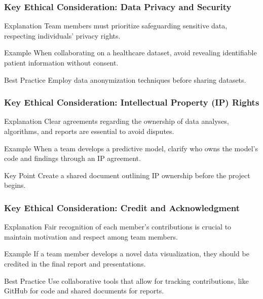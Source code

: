 \documentclass[aspectratio=169]{beamer}
\begin{document}
\begin{frame}[fragile]
    \frametitle{Key Ethical Consideration: Data Privacy and Security}
    \begin{block}{Explanation}
        Team members must prioritize safeguarding sensitive data, respecting individuals' privacy rights.
    \end{block}
    \begin{exampleblock}{Example}
        When collaborating on a healthcare dataset, avoid revealing identifiable patient information without consent.
    \end{exampleblock}
    \begin{block}{Best Practice}
        Employ data anonymization techniques before sharing datasets.
    \end{block}
\end{frame}

\begin{frame}[fragile]
    \frametitle{Key Ethical Consideration: Intellectual Property (IP) Rights}
    \begin{block}{Explanation}
        Clear agreements regarding the ownership of data analyses, algorithms, and reports are essential to avoid disputes.
    \end{block}
    \begin{exampleblock}{Example}
        When a team develops a predictive model, clarify who owns the model's code and findings through an IP agreement.
    \end{exampleblock}
    \begin{block}{Key Point}
        Create a shared document outlining IP ownership before the project begins.
    \end{block}
\end{frame}

\begin{frame}[fragile]
    \frametitle{Key Ethical Consideration: Credit and Acknowledgment}
    \begin{block}{Explanation}
        Fair recognition of each member's contributions is crucial to maintain motivation and respect among team members.
    \end{block}
    \begin{exampleblock}{Example}
        If a team member develops a novel data visualization, they should be credited in the final report and presentations.
    \end{exampleblock}
    \begin{block}{Best Practice}
        Use collaborative tools that allow for tracking contributions, like GitHub for code and shared documents for reports.
    \end{block}
\end{frame}
\end{document}
